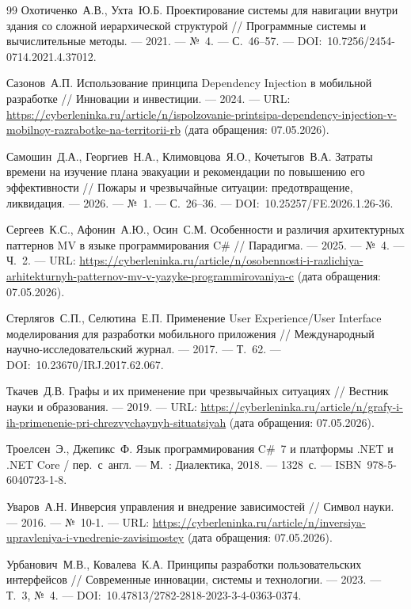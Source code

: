 \begin{thebibliography}{99}
	 Охотиченко~А.В., Ухта~Ю.Б. Проектирование системы для навигации внутри здания со сложной иерархической структурой // Программные системы и вычислительные методы. --- 2021. --- №~4. --- С.~46--57. --- DOI:~10.7256/2454-0714.2021.4.37012.
	
	 Сазонов~А.П. Использование принципа Dependency Injection в мобильной разработке // Инновации и инвестиции. --- 2024. --- URL: \url{https://cyberleninka.ru/article/n/ispolzovanie-printsipa-dependency-injection-v-mobilnoy-razrabotke-na-territorii-rb} (дата обращения: 07.05.2026).
	
	 Самошин~Д.А., Георгиев~Н.А., Климовцова~Я.О., Кочетыгов~В.А. Затраты времени на изучение плана эвакуации и рекомендации по повышению его эффективности // Пожары и чрезвычайные ситуации: предотвращение, ликвидация. --- 2026. --- №~1. --- С.~26--36. --- DOI:~10.25257/FE.2026.1.26-36.
	
	 Сергеев~К.С., Афонин~А.Ю., Осин~С.М. Особенности и различия архитектурных паттернов MV в языке программирования C\# // Парадигма. --- 2025. --- №~4. --- Ч.~2. --- URL: \url{https://cyberleninka.ru/article/n/osobennosti-i-razlichiya-arhitekturnyh-patternov-mv-v-yazyke-programmirovaniya-c} (дата обращения: 07.05.2026).
	
	 Стерлягов~С.П., Селютина~Е.П. Применение User Experience/User Interface моделирования для разработки мобильного приложения // Международный научно-исследовательский журнал. --- 2017. --- Т.~62. --- DOI:~10.23670/IRJ.2017.62.067.
	
	 Ткачев~Д.В. Графы и их применение при чрезвычайных ситуациях // Вестник науки и образования. --- 2019. --- URL: \url{https://cyberleninka.ru/article/n/grafy-i-ih-primenenie-pri-chrezvychaynyh-situatsiyah} (дата обращения: 07.05.2026).
	
	 Троелсен~Э., Джепикс~Ф. Язык программирования C\#~7 и платформы .NET и .NET Core / пер.~с~англ. --- М.~: Диалектика, 2018. --- 1328~с. --- ISBN~978-5-6040723-1-8.
	
	 Уваров~А.Н. Инверсия управления и внедрение зависимостей // Символ науки. --- 2016. --- №~10-1. --- URL: \url{https://cyberleninka.ru/article/n/inversiya-upravleniya-i-vnedrenie-zavisimostey} (дата обращения: 07.05.2026).
	
	 Урбанович~М.В., Ковалева~К.А. Принципы разработки пользовательских интерфейсов // Современные инновации, системы и технологии. --- 2023. --- Т.~3, №~4. --- DOI:~10.47813/2782-2818-2023-3-4-0363-0374.
	

\end{thebibliography}
